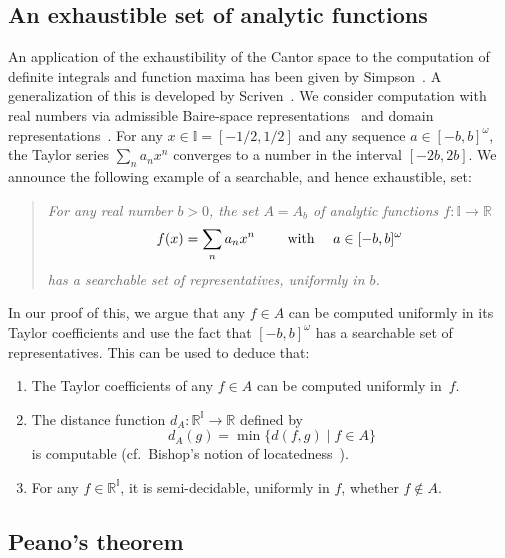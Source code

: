 \documentclass{LMCS}
\newcommand{\R}{\mathbb{R}}
\newcommand{\I}{\mathbb{I}}
\begin{document}
\subsection{An exhaustible set of analytic functions}
An application of the exhaustibility of the Cantor space to the
computation of definite integrals and function maxima has been given
by Simpson~\cite{simpson:integration}. A generalization of this is
developed by Scriven~\cite{scriven}. We consider computation with real
numbers via admissible Baire-space
representations~\cite{weihrauch:analysis} and domain
representations~\cite{blanck}.  For any $x \in \I = [-1/2,1/2]$ and
any sequence $a \in [-b,b]^\omega$, the Taylor series $\sum_n a_n x^n$
converges to a number in the interval $[-2b,2b]$.
We announce the following example of a searchable, and hence
exhaustible, set:
\begin{quote}
  \em For any real number $b > 0$, the set $A = A_b$ of analytic
  functions $f \colon \I \to \R$
\[
\text{$f(x)=\sum_n a_n x^n$ \qquad with \quad $a \in [-b,b]^\omega$}
\]  
has a searchable set of representatives, uniformly in $b$.
\end{quote}
In our proof of this, we argue that any $f \in A$ can be computed
uniformly in its Taylor coefficients and use the fact that
 $[-b,b]^\omega$ has a searchable set of representatives.
This can be used to deduce that:
\pagebreak[3]
  \begin{enumerate}
  \item The Taylor coefficients of any $f \in A$ can be computed
        uniformly in~$f$.

  \item The distance function $d_A \colon \R^\I \to \R$ defined by
    \[ d_A(g) = \min \{ d(f,g) \mid f \in A \} \] is computable (cf.\
    Bishop's notion of locatedness~\cite{MR36:4930,bishop:bridges}).

  \item For any $f \in \R^\I$, it is semi-decidable, uniformly in $f$,
        whether $f \not \in A$. 
  \end{enumerate}

\subsection{Peano's theorem}
\end{document}
